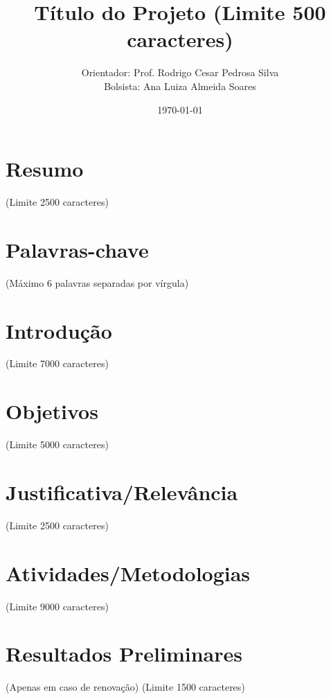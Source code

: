 \documentclass{article}
\title{Título do Projeto (Limite 500 caracteres)}
\author{Orientador: Prof. Rodrigo Cesar Pedrosa Silva \\
Bolsista: Ana Luiza Almeida Soares}
\date{\today}
\begin{document}
\maketitle


\section{Resumo}
(Limite 2500 caracteres)	
   
\section{Palavras-chave}
(Máximo 6 palavras separadas por vírgula)	
   
\section{Introdução}
	
\citep{adams1995hitchhiker}  

(Limite 7000 caracteres)	
   
\section{Objetivos}
(Limite 5000 caracteres)	
   
\section{Justificativa/Relevância}
(Limite 2500 caracteres)	
   
\section{Atividades/Metodologias}
(Limite 9000 caracteres)	
   
\section{Resultados Preliminares}
(Apenas em caso de renovação)
(Limite 1500 caracteres)	
   
 



\end{document}
